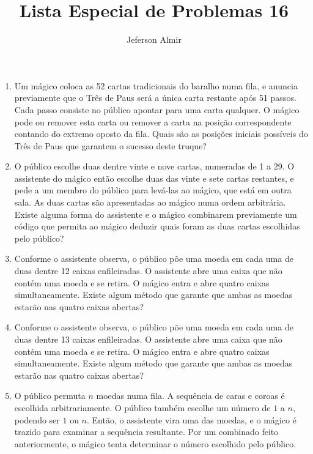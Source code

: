 \documentclass{article}
\title{Lista Especial de Problemas 16}
\author{Jeferson Almir}
\date{}
\begin{document}
\maketitle

\begin{enumerate}
    \item Um mágico coloca as 52 cartas tradicionais do baralho numa fila, e anuncia previamente que o Três de Paus será a única carta restante após 51 passos. Cada passo consiste no público apontar para uma carta qualquer. O mágico pode ou remover esta carta ou remover a carta na posição correspondente contando do extremo oposto da fila. Quais são as posições iniciais possíveis do Três de Paus que garantem  o sucesso deste truque?
    
    \item O público escolhe duas dentre vinte e nove cartas, numeradas de 1 a 29. O assistente do mágico então escolhe duas das vinte e sete cartas restantes, e pede a um membro do público para levá-las ao mágico, que está em outra sala. As duas cartas são apresentadas ao mágico numa ordem arbitrária. Existe alguma forma do assistente e o mágico combinarem previamente um código que permita ao mágico deduzir quais foram as duas cartas escolhidas pelo público?
    
    \item Conforme o assistente observa, o público põe uma moeda em cada uma de duas dentre 12 caixas enfileiradas. O assistente abre uma caixa que não contém uma moeda e se retira. O mágico entra e abre quatro caixas simultaneamente. Existe algum método que garante que ambas as moedas estarão nas quatro caixas abertas?
    
    \item Conforme o assistente observa, o público põe uma moeda em cada uma de duas dentre 13 caixas enfileiradas. O assistente abre uma caixa que não contém uma moeda e se retira. O mágico entra e abre quatro caixas simultaneamente. Existe algum método que garante que ambas as moedas estarão nas quatro caixas abertas?
    
    \item O público permuta $n$ moedas numa fila. A sequência de caras e coroas é escolhida arbitrariamente. O público também escolhe um número de $1$ a $n$, podendo ser $1$ ou $n$. Então, o assistente vira uma das moedas, e o mágico é trazido para examinar a sequência resultante. Por um combinado feito anteriormente, o mágico tenta determinar o número escolhido pelo público.
    

\end{enumerate}
\end{document}
